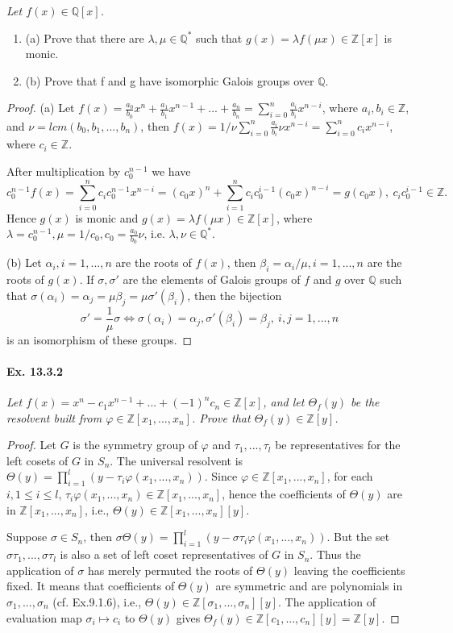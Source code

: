 \documentclass[11pt,a4paper]{article}
\newcommand{\be} {\begin{enumerate}}
\newcommand{\ee} {\end{enumerate}}
\newcommand{\Q}{\mathbb{Q}}
\newcommand{\Z}{\mathbb{Z}}
\begin{document}
{\it Let $f(x) \in \Q[x]$.
\be
\item[(a)] Prove that there are $\lambda, \mu \in \Q^*$ such that $g(x)=\lambda f(\mu x)\in\Z[x]$ is monic.
\item[(b)] Prove that f and g have isomorphic Galois groups over $\Q$.
\ee
\begin{proof}
\item[(a)] Let $f(x)=\frac {a_0}{b_0}x^n+\frac {a_1}{b_1}x^{n-1}+...+\frac {a_n}{b_n}=\sum_{i=0}^n \frac {a_i}{b_i}x^{n-i}$, where $a_i,b_i \in \Z$, and $\nu=lcm(b_0,b_1,...,b_n)$, then $f(x)=1/\nu \sum_{i=0}^n \frac {a_i}{b_i}\nu x^{n-i}=\sum_{i=0}^n c_i x^{n-i}$, where $c_i \in \Z$.

After multiplication by $c_0^{n-1}$ we have $$c_0^{n-1}f(x)=\sum_{i=0}^n c_i c_0^{n-1} x^{n-i}=(c_0 x)^n+\sum_{i=1}^n c_i c_0^{i-1} (c_0 x)^{n-i}=g(c_0 x), ~ c_i c_0^{i-1} \in \Z.$$ Hence $g(x)$ is monic   and $g(x)=\lambda f(\mu x)\in\Z[x]$, where $\lambda=c_0^{n-1},\mu=1/c_0, c_0=\frac{a_0}{b_0} \nu$, i.e. $\lambda,\nu \in \Q^*$.


\item[(b)] Let $\alpha_i, i=1,...,n$ are the roots of $f(x)$, then $\beta_i=\alpha_i/\mu, i=1,...,n$ are the roots of $g(x)$. If $\sigma,\sigma'$ are the elements of Galois groups of $f$ and $g$ over $\Q$ such that $\sigma(\alpha_i)=\alpha_j=\mu\beta_j=\mu\sigma'(\beta_i)$, then the bijection $$\sigma'=\frac{1}{\mu}\sigma \iff  \sigma(\alpha_i)=\alpha_j,\sigma'(\beta_i)=\beta_j,~i,j=1,...,n $$  is an isomorphism of these groups.  
\end{proof}
}

\paragraph{Ex. 13.3.2}

{\it Let $f(x)=x^n-c_1x^{n-1}+...+(-1)^n c_n \in \Z[x]$, and let $\Theta_f(y)$ be the resolvent built from $\varphi \in \Z [x_1,...,x_n]$. Prove that $\Theta_f(y) \in \Z[y]$.

\begin{proof}
Let $G$ is the symmetry group of $\varphi$ and $\tau_1,...,\tau_l$ be representatives for the left cosets of $G$ in $S_n$. The universal resolvent is $\Theta(y)=\prod_{i=1}^l ( y - \tau_i\varphi(x_1,...,x_n))$. Since $\varphi \in \Z [x_1,...,x_n]$, for each $i, 1\leq i \leq l$, $\tau_i\varphi(x_1,...,x_n)\in \Z [x_1,...,x_n]  $, hence the coefficients of $\Theta(y)$ are in $\Z [x_1,...,x_n]  $, i.e., $\Theta(y)\in \Z [x_1,...,x_n][y]  $.

Suppose $\sigma \in S_n$, then $\sigma\Theta(y)=\prod_{i=1}^l ( y - \sigma\tau_i\varphi(x_1,...,x_n))$. But the set $\sigma\tau_1,...,\sigma\tau_l$ is also a set of left coset representatives of $G$ in $S_n$. Thus the application of $\sigma$ has merely permuted the roots of $\Theta(y)$ leaving the coefficients fixed. It means that coefficients of $\Theta(y)$ are symmetric and are polynomials in $\sigma_1,...,\sigma_n$ (cf. Ex.9.1.6), i.e., $\Theta(y)\in \Z [\sigma_1,...,\sigma_n][y]  $.
The application of evaluation map $\sigma_i \mapsto c_i$ to $\Theta(y)$ gives $\Theta_f(y) \in \Z [c_1,...,c_n][y] = \Z[y]$.
\end{proof}
}
\end{document}
